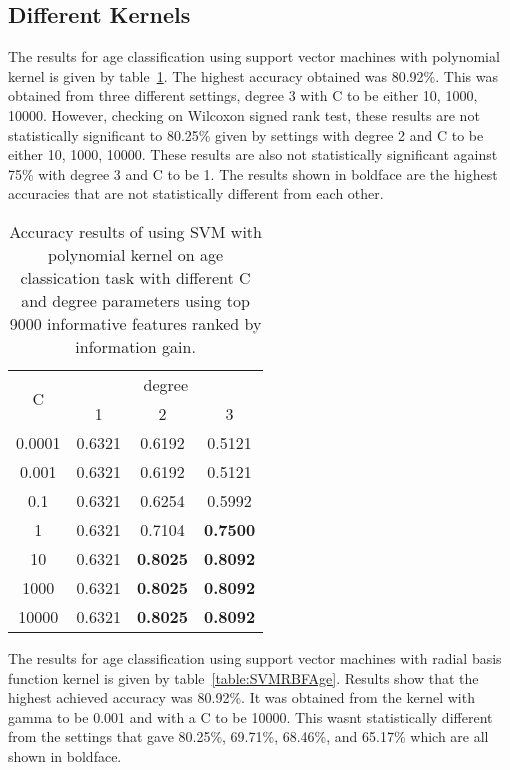\documentclass[a4paper]{llncs}
\begin{document}
\subsection{Different Kernels}
The results for age classification using support vector machines with polynomial kernel is given by table~\ref{table:SVMPolyAge}. The highest accuracy obtained was 80.92\%. This was obtained from three different settings, degree 3 with C to be either 10, 1000, 10000. However, checking on Wilcoxon signed rank test, these results are not statistically significant to 80.25\% given by settings with degree 2 and C to be either 10, 1000, 10000. These results are also not statistically significant against 75\% with degree 3 and C to be 1. The results shown in boldface are the highest accuracies that are not statistically different from each other. 

\begin{table}[!htbp]
\centering
\begin{tabular}{|c|c|c|c|}
\hline
\multirow{2}{*}{C} & \multicolumn{3}{c|}{degree}       \\ \cline{2-4} 
                   & 1      & 2      & 3               \\ \hline
0.0001             & 0.6321 & 0.6192 & 0.5121          \\ \hline
0.001              & 0.6321 & 0.6192 & 0.5121          \\ \hline
0.1                & 0.6321 & 0.6254 & 0.5992          \\ \hline
1                  & 0.6321 & 0.7104 & \textbf{0.7500} \\ \hline
10                 & 0.6321 & \textbf{0.8025} & \textbf{0.8092} \\ \hline
1000               & 0.6321 & \textbf{0.8025} & \textbf{0.8092} \\ \hline
10000              & 0.6321 & \textbf{0.8025} & \textbf{0.8092} \\ \hline
\end{tabular}
\caption{Accuracy results of using SVM with polynomial kernel on age classication task with different C and degree parameters using top 9000 informative features ranked by information gain.}
\label{table:SVMPolyAge}
\end{table}

The results for age classification using support vector machines with radial basis function kernel is given by table~\ref{table:SVMRBFAge}. Results show that the highest achieved accuracy was 80.92\%. It was obtained from the kernel with gamma to be 0.001 and with a C to be 10000. This wasnt statistically different from the settings that gave 80.25\%, 69.71\%, 68.46\%, and 65.17\% which are all shown in boldface. 
\end{document}
